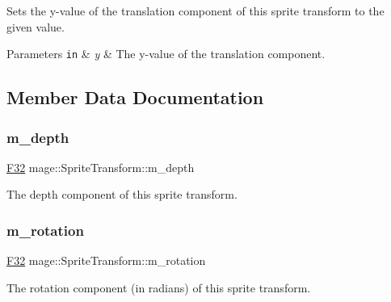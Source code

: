 Sets the y-\/value of the translation component of this sprite transform to the given value.


\begin{DoxyParams}[1]{Parameters}
\mbox{\tt in}  & {\em y} & The y-\/value of the translation component. \\
\hline
\end{DoxyParams}


\subsection{Member Data Documentation}
\mbox{\label{classmage_1_1_sprite_transform_a646e129b2e9702eec23b4c673f07dfef}} 
\subsubsection{\texorpdfstring{m\+\_\+depth}{m\_depth}}
{\footnotesize\ttfamily \mbox{\hyperlink{namespacemage_aa97e833b45f06d60a0a9c4fc22ae02c0}{F32}} mage\+::\+Sprite\+Transform\+::m\+\_\+depth\hspace{0.3cm}{\ttfamily [private]}}

The depth component of this sprite transform. \mbox{\label{classmage_1_1_sprite_transform_a7c705543e7f6a9c7e7a517ffef2cb4b9}} 
\subsubsection{\texorpdfstring{m\+\_\+rotation}{m\_rotation}}
{\footnotesize\ttfamily \mbox{\hyperlink{namespacemage_aa97e833b45f06d60a0a9c4fc22ae02c0}{F32}} mage\+::\+Sprite\+Transform\+::m\+\_\+rotation\hspace{0.3cm}{\ttfamily [private]}}

The rotation component (in radians) of this sprite transform. \mbox{\label{classmage_1_1_sprite_transform_aa6a3a2653a00fb17116ce81979214e27}} 

